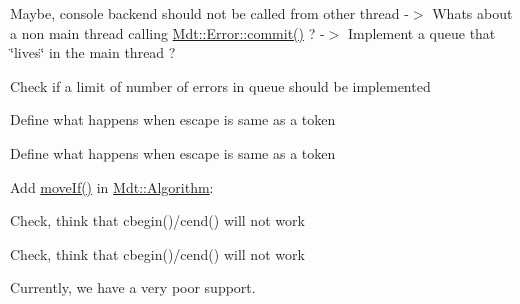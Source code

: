 
\begin{DoxyRefList}
\item[\label{todo__todo000006}%
\hypertarget{todo__todo000006}{}%
Namespace \hyperlink{namespace_mdt}{Mdt} ]Maybe, console backend should not be called from other thread -\/$>$ What\textquotesingle{}s about a non main thread calling \hyperlink{class_mdt_1_1_error_a1b4a57bd4177d2985abd62b6b49a43f8}{Mdt\+::\+Error\+::commit()} ? -\/$>$ Implement a queue that \char`\"{}lives\char`\"{} in the main thread ? 

Check if a limit of number of errors in queue should be implemented  
\item[\label{todo__todo000001}%
\hypertarget{todo__todo000001}{}%
Member \hyperlink{namespace_mdt_1_1_algorithm_aadf56549e804ffc292f5b61d4872512b}{Mdt\+:\+:Algorithm\+:\+:index\+Of\+First\+Escaped\+Token} (const Q\+String \&str, int from, const std\+::vector$<$ Q\+Char $>$ \&tokens, const Q\+Char \&escape)]Define what happens when escape is same as a token  
\item[\label{todo__todo000002}%
\hypertarget{todo__todo000002}{}%
Member \hyperlink{namespace_mdt_1_1_algorithm_a25b3247b25cdf25db6a2641269e37e0d}{Mdt\+:\+:Algorithm\+:\+:index\+Of\+First\+Non\+Escaped\+Token} (const Q\+String \&str, int from, const std\+::vector$<$ Q\+Char $>$ \&tokens, const Q\+Char \&escape)]Define what happens when escape is same as a token  
\item[\label{todo__todo000003}%
\hypertarget{todo__todo000003}{}%
Member \hyperlink{namespace_mdt_1_1_algorithm_a1f739be25cc7de2c30a21b85d9b25f0a}{Mdt\+:\+:Algorithm\+:\+:move\+If} (Forward\+It first, Forward\+It last, Output\+It d\+\_\+first, Unary\+Predicate p)]Add \hyperlink{namespace_mdt_1_1_algorithm_a1f739be25cc7de2c30a21b85d9b25f0a}{move\+If()} in \hyperlink{namespace_mdt_1_1_algorithm}{Mdt\+::\+Algorithm}\+:

Check, think that cbegin()/cend() will not work

Check, think that cbegin()/cend() will not work 
\item[\label{todo__todo000005}%
\hypertarget{todo__todo000005}{}%
Class \hyperlink{class_mdt_1_1_deploy_utils_1_1_platform}{Mdt\+:\+:Deploy\+Utils\+:\+:Platform} ]Currently, we have a very poor support. 
\end{DoxyRefList}